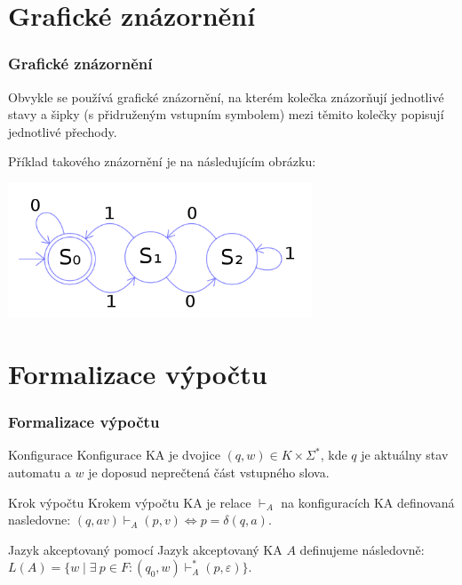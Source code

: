 \documentclass[11pt,hyperref={unicode}]{beamer}
\begin{document}
	\section{Grafické znázornění}
	\begin{frame}
		\frametitle{Grafické znázornění}
		Obvykle se používá grafické znázornění, na kterém kolečka znázorňují jednotlivé stavy a šipky (s přidruženým vstupním symbolem) mezi těmito kolečky popisují jednotlivé přechody.
		
		Příklad takového znázornění je na následujícím obrázku:\\
		\begin{center}
			\includegraphics[height=4cm]{example.png}
		\end{center}
	\end{frame}

	\section{Formalizace výpočtu}
	\begin{frame}
		\frametitle{Formalizace výpočtu}
		\begin{block}{Konfigurace}
			Konfigurace KA je dvojice $(q , w) \in K \times \Sigma^*$, kde $q$ je aktuálny stav automatu a $w$ je doposud neprečtená část vstupného slova.
		\end{block}
		\begin{block}{Krok výpočtu}
			Krokem výpočtu KA je relace $\vdash_A$ na konfiguracích KA definovaná nasledovne: $(q, av) \vdash_A (p, v) \Longleftrightarrow p = \delta (q, a)$.
		\end{block}
		\begin{block}{Jazyk akceptovaný pomocí}
			Jazyk akceptovaný KA $A$ definujeme následovně:
			$L(A) = \{w \mid \exists\ p\in F:(q_0, w) \vdash_A^*(p,  \varepsilon)\}.$
		\end{block}
	\end{frame}
\end{document}
